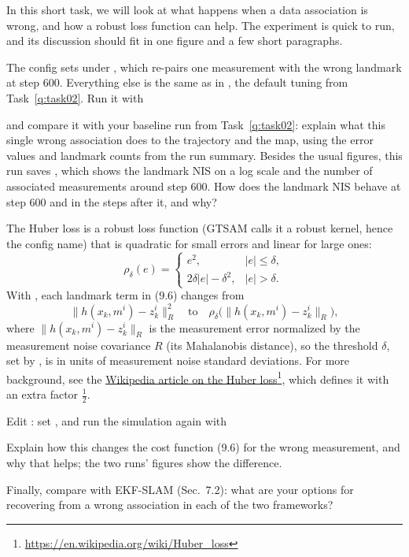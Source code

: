 \label{q:task04}
In this short task, we will look at what happens when a data association is wrong, and how a robust loss function can help. The experiment is quick to run, and its discussion should fit in one figure and a few short paragraphs.

The config  sets  under , which re-pairs one measurement with the wrong landmark at step 600. Everything else is the same as in , the default tuning from Task~\ref{q:task02}. Run it with
\begin{center}
\end{center}
and compare it with your baseline run from Task~\ref{q:task02}: explain what this single wrong association does to the trajectory and the map, using the error values and landmark counts from the run summary. Besides the usual figures, this run saves , which shows the landmark NIS on a log scale and the number of associated measurements around step 600. How does the landmark NIS behave at step 600 and in the steps after it, and why?

The Huber loss is a robust loss function (GTSAM calls it a robust kernel, hence the config name) that is quadratic for small errors and linear for large ones:
\[
    \rho_\delta(e) =
    \begin{cases}
        e^2, & |e| \le \delta, \\
        2\delta|e| - \delta^2, & |e| > \delta.
    \end{cases}
\]
With , each landmark term in (9.6) changes from
\[
    \|h(x_k, m^i) - z^i_k\|_R^2
    \quad\text{to}\quad
    \rho_\delta\big(\|h(x_k, m^i) - z^i_k\|_R\big),
\]
where \(\|h(x_k, m^i) - z^i_k\|_R\) is the measurement error normalized by the measurement noise covariance \(R\) (its Mahalanobis distance), so the threshold \(\delta\), set by , is in units of measurement noise standard deviations. For more background, see the \href{https://en.wikipedia.org/wiki/Huber_loss}{Wikipedia article on the Huber loss}\footnote{\href{https://en.wikipedia.org/wiki/Huber_loss}{https://en.wikipedia.org/wiki/Huber\_loss}}, which defines it with an extra factor \(\tfrac12\).

Edit : set , and run the simulation again with
\begin{center}
\end{center}
Explain how this changes the cost function (9.6) for the wrong measurement, and why that helps; the two runs'  figures show the difference.

Finally, compare with EKF-SLAM (Sec.\ 7.2): what are your options for recovering from a wrong association in each of the two frameworks?
